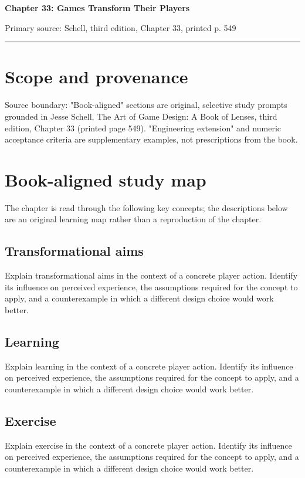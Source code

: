\documentclass[11pt]{article}
\begin{document}
{\huge\bfseries\color{suiteblue} Chapter 33: Games Transform Their Players}\par
\vspace{0.15in}
{\normalsize\color{suitegray} Primary source: Schell, third edition, Chapter 33, printed p. 549}\par
\vspace{0.15in}\hrule\vspace{0.15in}

\section{Scope and provenance}
Source boundary: "Book-aligned" sections are original, selective study prompts grounded in Jesse Schell, The Art of Game Design: A Book of Lenses, third edition, Chapter 33 (printed page 549). "Engineering extension" and numeric acceptance criteria are supplementary examples, not prescriptions from the book.


\section{Book-aligned study map}
The chapter is read through the following key concepts; the descriptions below are an original learning map rather than a reproduction of the chapter.


\subsection{Transformational aims}
Explain transformational aims in the context of a concrete player action. Identify its influence on perceived experience, the assumptions required for the concept to apply, and a counterexample in which a different design choice would work better.


\subsection{Learning}
Explain learning in the context of a concrete player action. Identify its influence on perceived experience, the assumptions required for the concept to apply, and a counterexample in which a different design choice would work better.


\subsection{Exercise}
Explain exercise in the context of a concrete player action. Identify its influence on perceived experience, the assumptions required for the concept to apply, and a counterexample in which a different design choice would work better.
\end{document}
